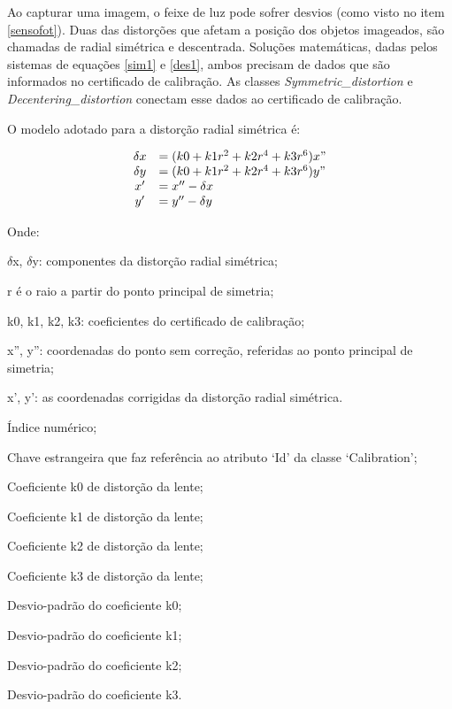 Ao capturar uma imagem, o feixe de luz pode sofrer desvios (como visto no item \ref{sensofot}). Duas das distorções que afetam a posição dos objetos imageados, são chamadas de radial simétrica e descentrada. Soluções matemáticas, dadas pelos sistemas de equações \ref{sim1} e \ref{des1}, ambos precisam de dados que são informados no certificado de calibração. As classes \textit{Symmetric\_distortion} e  \textit{Decentering\_distortion} conectam esse dados ao certificado de calibração. 

O modelo adotado para a distorção radial simétrica é: 

\begin{equation} \label{sim1}
\begin{array}{cl}
\delta x &= (k0 + k1r^{2} +k2r^{4} +k3r^{6})x" \\
\delta y &= (k0 + k1r^{2} +k2r^{4} +k3r^{6})y" \\
x' &= x'' - \delta x \\
y' &= y'' - \delta y
\end{array}
\end{equation}

Onde:

$\delta$x, $\delta$y: componentes da distorção radial simétrica;

r é o raio a partir do ponto principal de simetria;

k0, k1, k2, k3: coeficientes do certificado de
calibração;

x”, y”: coordenadas do ponto sem correção, referidas ao ponto principal de simetria;

x’, y’: as coordenadas corrigidas da distorção radial simétrica.

\begin{description}[labelwidth=2cm, itemsep=-0.3cm]
\item [Classe Symmetric\_distortion]
\item[Id:] Índice numérico;
\item[Id\_calib:] Chave estrangeira que faz referência ao atributo `Id' da classe `Calibration';
\item[K0:] Coeficiente k0 de distorção da lente;
\item[K1:] Coeficiente k1 de distorção da lente;
\item[K2:] Coeficiente k2 de distorção da lente;
\item[K3:] Coeficiente k3 de distorção da lente; 
\item[Sigma\_k0:] Desvio-padrão do coeficiente k0;
\item[Sigma\_k1:] Desvio-padrão do coeficiente k1;
\item[Sigma\_k2:] Desvio-padrão do coeficiente k2;
\item[Sigma\_k3:] Desvio-padrão do coeficiente k3.
\end{description}


